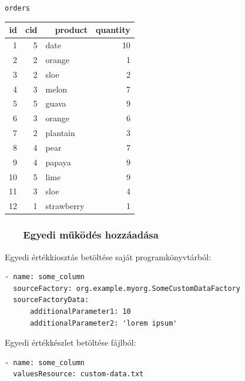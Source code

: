 \documentclass[
]{beamer}
\newcommand{\slidetitle}[2]{\frametitle{{\small #1 ~ \ding{226} ~ } \normalsize \textbf{#2} }}
\begin{document}
\begin{frame}
\begin{minipage}[c]{0.45\textwidth}
        \vspace{0.5cm}
        
        \normalsize \texttt{orders}
        \vspace{0.1cm}
        
        \tiny
        \begin{tabular}{ |r|r|l|r| }
        \hline
            id & cid & ~~product & quantity \\
        \hline
            1 & 5 & date & 10 \\
            2 & 2 & orange & 1 \\
            3 & 2 & sloe & 2 \\
            4 & 3 & melon & 7 \\
            5 & 5 & guava & 9 \\
            6 & 3 & orange & 6 \\
            7 & 2 & plantain & 3 \\
            8 & 4 & pear & 7 \\
            9 & 4 & papaya & 9 \\
            10 & 5 & lime & 9 \\
            11 & 3 & sloe & 4 \\
            12 & 1 & strawberry & 1 \\
        \hline
        \end{tabular}
    \end{minipage}
\end{frame}

\begin{frame}[containsverbatim]
    \slidetitle{\sectionshorttitle}{Egyedi működés hozzáadása}
    
    Egyedi értékkiosztás betöltése saját programkönyvtárból:
    
    \vspace{0.5em}
    
    \begin{verbatim}
- name: some_column
  sourceFactory: org.example.myorg.SomeCustomDataFactory
  sourceFactoryData:
      additionalParameter1: 10
      additionalParameter2: 'lorem ipsum'
    \end{verbatim}
    
    \vspace{1em}
    
    Egyedi értékkészlet betöltése fájlból:
    
    \vspace{0.5em}
    
    \begin{verbatim}
- name: some_column
  valuesResource: custom-data.txt
    \end{verbatim}
    
\end{frame}
\end{document}
